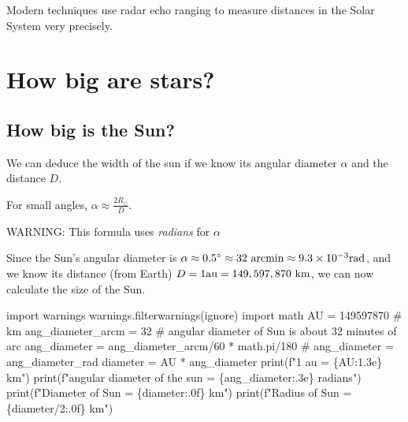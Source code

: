 \documentclass[
  letterpaper,
  DIV=11,
  numbers=noendperiod]{scrreprt}
\newenvironment{Shaded}{\begin{snugshade}}{\end{snugshade}}
\newcommand{\BuiltInTok}[1]{\textcolor[rgb]{0.00,0.23,0.31}{#1}}
\newcommand{\CommentTok}[1]{\textcolor[rgb]{0.37,0.37,0.37}{#1}}
\newcommand{\DecValTok}[1]{\textcolor[rgb]{0.68,0.00,0.00}{#1}}
\newcommand{\ImportTok}[1]{\textcolor[rgb]{0.00,0.46,0.62}{#1}}
\newcommand{\NormalTok}[1]{\textcolor[rgb]{0.00,0.23,0.31}{#1}}
\newcommand{\OperatorTok}[1]{\textcolor[rgb]{0.37,0.37,0.37}{#1}}
\newcommand{\SpecialCharTok}[1]{\textcolor[rgb]{0.37,0.37,0.37}{#1}}
\newcommand{\SpecialStringTok}[1]{\textcolor[rgb]{0.13,0.47,0.30}{#1}}
\newcommand{\StringTok}[1]{\textcolor[rgb]{0.13,0.47,0.30}{#1}}
\begin{document}
Modern techniques use radar echo ranging to measure distances in the
Solar System very precisely.


\hypertarget{how-big-are-stars}{%
\chapter{How big are stars?}\label{how-big-are-stars}}

\hypertarget{how-big-is-the-sun}{%
\section{How big is the Sun?}\label{how-big-is-the-sun}}

We can deduce the width of the sun if we know its angular diameter
\(\alpha\) and the distance \(D\).

For small angles, \(\alpha \approx \frac{2R_\odot}{D}\).

WARNING: This formula uses \emph{radians} for \(\alpha\)

Since the Sun's angular diameter is
\(\alpha\approx 0.5^\circ \approx 32 \ \rm{arcmin} \approx 9.3\times 10^{-3} \rm{rad}\),
and we know its distance (from Earth)
\(D = 1 \rm{au} = 149,597,870 \ \rm{km}\), we can now calculate the size
of the Sun.

\begin{Shaded}
\begin{Highlighting}[]
\ImportTok{import}\NormalTok{ warnings}
\NormalTok{warnings.filterwarnings(}\StringTok{\textquotesingle{}ignore\textquotesingle{}}\NormalTok{)}
\ImportTok{import}\NormalTok{ math}
\NormalTok{AU }\OperatorTok{=} \DecValTok{149597870} \CommentTok{\# km}
\NormalTok{ang\_diameter\_arcm }\OperatorTok{=} \DecValTok{32} \CommentTok{\# angular diameter of Sun is about 32 minutes of arc}
\NormalTok{ang\_diameter }\OperatorTok{=}\NormalTok{ ang\_diameter\_arcm}\OperatorTok{/}\DecValTok{60} \OperatorTok{*}\NormalTok{ math.pi}\OperatorTok{/}\DecValTok{180} 
\CommentTok{\# ang\_diameter = ang\_diameter\_rad}
\NormalTok{diameter }\OperatorTok{=}\NormalTok{ AU }\OperatorTok{*}\NormalTok{ ang\_diameter}
\BuiltInTok{print}\NormalTok{(}\SpecialStringTok{f"1 au = }\SpecialCharTok{\{}\NormalTok{AU}\SpecialCharTok{:1.3e\}}\SpecialStringTok{ km"}\NormalTok{)}
\BuiltInTok{print}\NormalTok{(}\SpecialStringTok{f"angular diameter of the sun =  }\SpecialCharTok{\{}\NormalTok{ang\_diameter}\SpecialCharTok{:.3e\}}\SpecialStringTok{ radians"}\NormalTok{)}
\BuiltInTok{print}\NormalTok{(}\SpecialStringTok{f"Diameter of Sun = }\SpecialCharTok{\{}\NormalTok{diameter}\SpecialCharTok{:.0f\}}\SpecialStringTok{ km"}\NormalTok{)}
\BuiltInTok{print}\NormalTok{(}\SpecialStringTok{f"Radius of Sun = }\SpecialCharTok{\{}\NormalTok{diameter}\OperatorTok{/}\DecValTok{2}\SpecialCharTok{:.0f\}}\SpecialStringTok{ km"}\NormalTok{)}
\end{Highlighting}
\end{Shaded}
\end{document}
